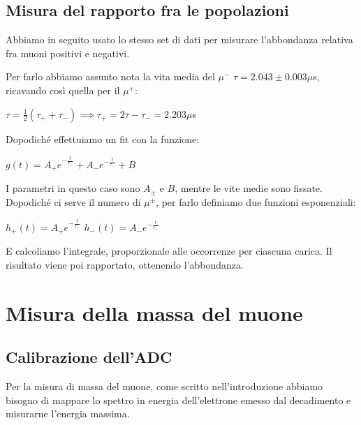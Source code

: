 \documentclass[10pt,a4paper]{article}
\begin{document}

\subsection{Misura del rapporto fra le popolazioni}

Abbiamo in seguito usato lo stesso set di dati per misurare l'abbondanza relativa fra muoni positivi e negativi. 

Per farlo abbiamo assunto nota la vita media del $\mu^{-}$ $\tau= 2.043\pm0.003 \mu$s, ricavando così quella per il $\mu^{+}$: 

\begin{center}
$\tau = \frac{1}{2}(\tau_{+}+\tau_{-}) \implies \tau_{+} = 2\tau -\tau_{-}= 2.203 \mu$s 
\end{center}

Dopodiché effettuiamo un fit con la funzione:

\begin{center}
$g(t) = A_{+}e^{-\frac{t}{\tau_+}}+A_{-}e^{-\frac{t}{\tau_-}} + B$
\end{center}

I parametri in questo caso sono $A_{\pm}$ e $B$, mentre le vite medie sono fissate. Dopodiché ci serve il numero di $\mu^{\pm}$, per farlo definiamo due funzioni esponenziali:

\begin{center}
$h_+(t) = A_+e^{-\frac{t}{\tau_+}}$
$h_-(t) = A_-e^{-\frac{t}{\tau_-}}$
\end{center}

E calcoliamo l'integrale, proporzionale alle occorrenze per ciascuna carica. Il risultato viene poi rapportato, ottenendo l'abbondanza. 


\newpage

\section{Misura della massa del muone}

\subsection{Calibrazione dell'ADC}

Per la misura di massa del muone, come scritto nell'introduzione abbiamo bisogno di mappare lo spettro in energia dell'elettrone emesso dal decadimento e misurarne l'energia massima.
\end{document}
